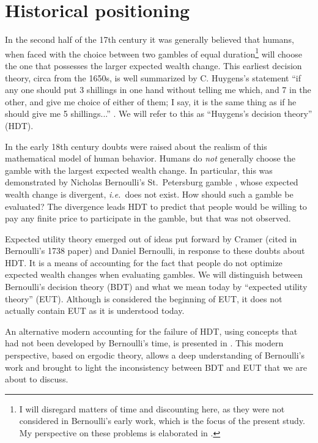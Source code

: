 \documentclass[pdftex]{article}
\newcommand{\ie}{{\it i.e.}\ }
\newcommand{\seclabel}[1]{\label{section:#1}}
\begin{document}
\section{Historical positioning}
\seclabel{Historical}
In the second half of the 17th century it was generally believed that humans, when faced with the choice between two gambles of equal duration\footnote{I will disregard matters of time and discounting here, as they were not considered in Bernoulli's early work, which is the focus of the present study. My perspective on these problems is elaborated in \cite{PetersGell-Mann2016}.} will choose the one that possesses the larger expected wealth change. This earliest decision theory, circa from the 1650s, is well summarized by C. Huygens's statement ``if any one should put 3 shillings in one hand without telling me which, and 7 in the other, and give me choice of either of them; I say, it is the same thing as if he should give me 5 shillings...'' \cite{Huygens1657}. We will refer to this as ``Huygens's decision theory'' (HDT). 

In the early 18th century doubts were raised about the realism of this mathematical model of human behavior. Humans do {\it not} generally choose the gamble with the largest expected wealth change. In particular, this was demonstrated by Nicholas Bernoulli's St.~Petersburg gamble \cite[p.~402]{Montmort1713}, whose expected wealth change is divergent, \ie does not exist. How should such a gamble be evaluated? The divergence leads HDT to predict that people would be willing to pay any finite price to participate in the gamble, but that was not observed.

Expected utility theory emerged out of ideas put forward by Cramer (cited in Bernoulli's 1738 paper) and Daniel Bernoulli, in response to these doubts about HDT. It is a means of accounting for the fact that people do not optimize expected wealth changes when evaluating gambles. We will distinguish between Bernoulli's decision theory (BDT) and what we mean today by ``expected utility theory'' (EUT). Although \cite{Bernoulli1738} is considered the beginning of EUT, it does not actually contain EUT as it is understood today.

An alternative modern accounting for the failure of HDT, using concepts that had not been developed by Bernoulli's time, is presented in \cite{PetersGell-Mann2016}. This modern perspective, based on ergodic theory, allows a deep understanding of Bernoulli's work and brought to light the inconsistency between BDT and EUT that we are about to discuss.
\end{document}
